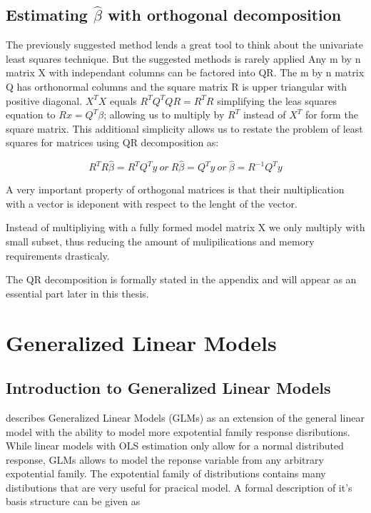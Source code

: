 \documentclass{article}
\begin{document}
    \subsection{Estimating $\widehat{\beta}$ with orthogonal decomposition}
    The previously suggested method lends a great tool to think about the univariate least squares technique. But the suggested methods is rarely applied
    Any m by n matrix X with independant columns can be factored into QR. The m by n matrix Q has orthonormal columns and the square matrix R is upper triangular with positive diagonal. $X^T X$ equals $R^T Q^T QR = R^T R$ simplifying the leas squares equation to $Rx = Q^T \beta$; allowing us to multiply by $R^T$ instead of $X^T$ for form the square matrix.  This additional simplicity allows us to restate the problem of least squares for matrices using QR decomposition as:

    \begin{equation} R^T R \widehat{\beta} = R^TQ^T y  \ or \   R\widehat{\beta}=Q^T y \ or \  \widehat{\beta} = R^{-1} Q^T y \end{equation}

    A very important property of orthogonal matrices is that their multiplication with a  vector is ideponent with respect to the lenght of the vector.

    Instead of multipliying with a fully formed model matrix X we only multiply with small subset, thus reducing the amount of mulipilications and memory requirements drasticaly.

    The QR decomposition is formally stated in the appendix and will appear as an essential part later in this thesis.


    \section{Generalized Linear Models}
    \subsection{Introduction to Generalized Linear Models}
    \cite{gamBook} describes Generalized Linear Models (GLMs) as an extension of the general linear model with the ability to model more expotential family response disributions. While linear models with OLS estimation only allow for a normal distributed response, GLMs allows to model the reponse variable from any arbitrary expotential family. The expotential family of distributions contains many distibutions that are very useful for pracical model. A formal description of it's basis structure can be given as
\end{document}
